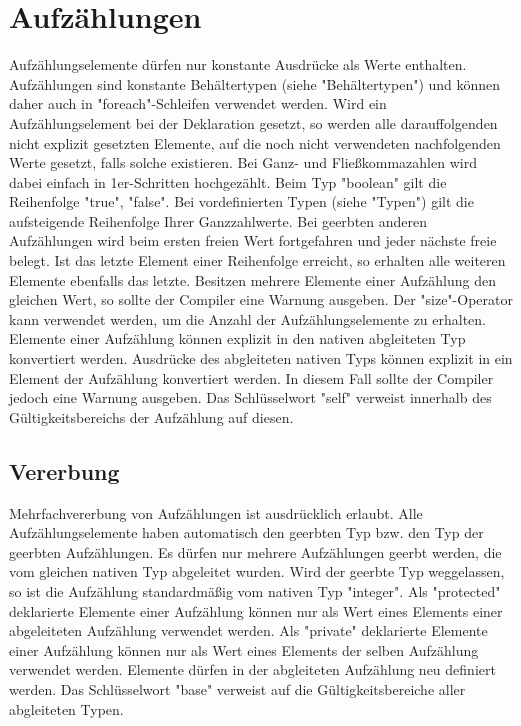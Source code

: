 \chapter{Aufzählungen}
Aufzählungselemente dürfen nur konstante Ausdrücke als Werte enthalten.
Aufzählungen sind konstante Behältertypen (siehe "Behältertypen") und können daher auch in "foreach"-Schleifen verwendet werden.
Wird ein Aufzählungselement bei der Deklaration gesetzt, so werden alle darauffolgenden nicht explizit gesetzten Elemente,
auf die noch nicht verwendeten nachfolgenden Werte gesetzt, falls solche existieren.
Bei Ganz- und Fließkommazahlen wird dabei einfach in 1er-Schritten hochgezählt.
Beim Typ "boolean" gilt die Reihenfolge "true", "false". Bei vordefinierten Typen (siehe "Typen") gilt die aufsteigende
Reihenfolge Ihrer Ganzzahlwerte.
Bei geerbten anderen Aufzählungen wird beim ersten freien Wert fortgefahren und jeder nächste freie belegt.
Ist das letzte Element einer Reihenfolge erreicht, so erhalten alle weiteren Elemente ebenfalls das letzte.
Besitzen mehrere Elemente einer Aufzählung den gleichen Wert, so sollte der Compiler eine Warnung ausgeben.
Der "size"-Operator kann verwendet werden, um die Anzahl der Aufzählungselemente zu erhalten.
Elemente einer Aufzählung können explizit in den nativen abgleiteten Typ konvertiert werden.
Ausdrücke des abgleiteten nativen Typs können explizit in ein Element der Aufzählung konvertiert werden. In diesem Fall
sollte der Compiler jedoch eine Warnung ausgeben.
Das Schlüsselwort "self" verweist innerhalb des Gültigkeitsbereichs der Aufzählung auf diesen.

\section{Vererbung}
Mehrfachvererbung von Aufzählungen ist ausdrücklich erlaubt.
Alle Aufzählungselemente haben automatisch den geerbten Typ bzw. den Typ der geerbten Aufzählungen.
Es dürfen nur mehrere Aufzählungen geerbt werden, die vom gleichen nativen Typ abgeleitet wurden.
Wird der geerbte Typ weggelassen, so ist die Aufzählung standardmäßig vom nativen Typ "integer".
Als "protected" deklarierte Elemente einer Aufzählung können nur als Wert eines Elements einer abgeleiteten Aufzählung
verwendet werden.
Als "private" deklarierte Elemente einer Aufzählung können nur als Wert eines Elements der selben Aufzählung
verwendet werden.
Elemente dürfen in der abgleiteten Aufzählung neu definiert werden.
Das Schlüsselwort "base" verweist auf die Gültigkeitsbereiche aller abgleiteten Typen.

